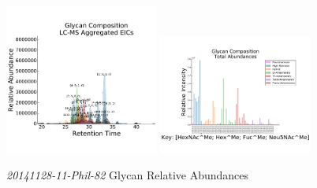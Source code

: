    \begin{figure}[!htbp]
        \centering
        \includegraphics[width=0.45\textwidth,valign=t]{figure/dp_phil_82_chromatograms.pdf}
        \includegraphics[width=0.45\textwidth,valign=t]{figure/dp_phil_82_abundances.pdf}
        \caption{\textit{20141128-11-Phil-82} Glycan Relative Abundances}
        \label{fig:dp_phil_82_aggregated_eics}
    \end{figure}

